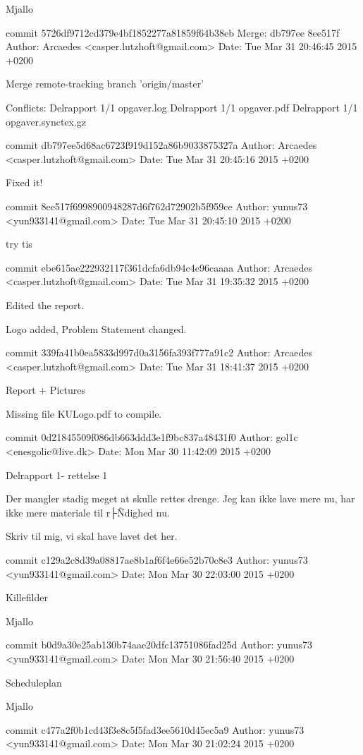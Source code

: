 \documentclass[12pt,a4paper]{article}
\begin{document}
Mjallo

commit 5726df9712cd379e4bf1852277a81859f64b38eb
Merge: db797ee 8ee517f
Author: Arcaedes <casper.lutzhoft@gmail.com>
Date:   Tue Mar 31 20:46:45 2015 +0200

Merge remote-tracking branch 'origin/master'

Conflicts:
Delrapport 1/1 opgaver.log
Delrapport 1/1 opgaver.pdf
Delrapport 1/1 opgaver.synctex.gz

commit db797ee5d68ac6723f919d152a86b9033875327a
Author: Arcaedes <casper.lutzhoft@gmail.com>
Date:   Tue Mar 31 20:45:16 2015 +0200

Fixed it!

commit 8ee517f6998900948287d6f762d72902b5f959ce
Author: yunus73 <yun933141@gmail.com>
Date:   Tue Mar 31 20:45:10 2015 +0200

try tis

commit ebe615ae222932117f361dcfa6db94c4e96caaaa
Author: Arcaedes <casper.lutzhoft@gmail.com>
Date:   Tue Mar 31 19:35:32 2015 +0200

Edited the report.

Logo added, Problem Statement changed.

commit 339fa41b0ea5833d997d0a3156fa393f777a91c2
Author: Arcaedes <casper.lutzhoft@gmail.com>
Date:   Tue Mar 31 18:41:37 2015 +0200

Report + Pictures

Missing file KULogo.pdf to compile.

commit 0d21845509f086db663ddd3e1f9bc837a48431f0
Author: gol1c <enesgolic@live.dk>
Date:   Mon Mar 30 11:42:09 2015 +0200

Delrapport 1- rettelse 1

Der mangler stadig meget at skulle rettes drenge. Jeg kan ikke lave mere
nu, har ikke mere materiale til r├Ñdighed nu.

Skriv til mig, vi skal have lavet det her.

commit c129a2c8d39a08817ae8b1af6f4e66e52b70c8e3
Author: yunus73 <yun933141@gmail.com>
Date:   Mon Mar 30 22:03:00 2015 +0200

Killefilder

Mjallo

commit b0d9a30e25ab130b74aae20dfc13751086fad25d
Author: yunus73 <yun933141@gmail.com>
Date:   Mon Mar 30 21:56:40 2015 +0200

Scheduleplan

Mjallo

commit c477a2f0b1cd43f3e8c5f5fad3ee5610d45ec5a9
Author: yunus73 <yun933141@gmail.com>
Date:   Mon Mar 30 21:02:24 2015 +0200
\end{document}
